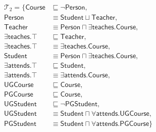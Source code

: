 \documentclass{amsart}
\begin{document}
   
   
   \begin{align*}
  \mathcal{T}_2 = \{\mathsf{Course} &\sqsubseteq \neg \mathsf{Person},\\
  \mathsf{Person} &\equiv \mathsf{Student} \sqcup \mathsf{Teacher}, \\ 
  \mathsf{Teacher} &\equiv \mathsf{Person} \sqcap \exists\mathsf{teaches}.\mathsf{Course}, \\
  \exists\mathsf{teaches}.\top &\sqsubseteq \mathsf{Teacher},\\
  \exists\mathsf{teaches}.\top &\equiv \exists\mathsf{teaches}.\mathsf{Course},\\
  \mathsf{Student} &\equiv \mathsf{Person} \sqcap \exists\mathsf{teaches}.\mathsf{Course}, \\
  \exists\mathsf{attends}.\top &\sqsubseteq \mathsf{Student},\\ 
  \exists\mathsf{attends}.\top &\equiv \exists\mathsf{attends}.\mathsf{Course},\\
  \mathsf{UGCourse} &\sqsubseteq \mathsf{Course},\\
  \mathsf{PGCourse} &\sqsubseteq \mathsf{Course},\\
   \mathsf{UGStudent} &\sqsubseteq \neg\mathsf{PGStudent},\\
  \mathsf{UGStudent} &\equiv\mathsf{Student} \sqcap  \forall\mathsf{attends}.\mathsf{UGCourse},\\
  \mathsf{PGStudent} &\equiv \mathsf{Student} \sqcap \forall\mathsf{attends}.\mathsf{PGCourse}\}
  \end{align*} 
  
\end{document}
